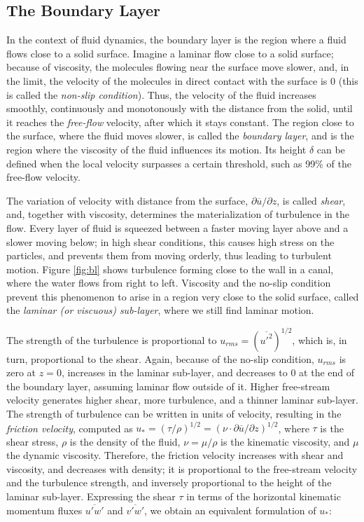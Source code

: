 \documentclass[a4paper]{book}
\begin{document}
\subsection{The Boundary Layer}
In the context of fluid dynamics, the boundary layer is the region where a fluid flows close to a solid surface. Imagine a laminar flow close to a solid surface; because of viscosity, the molecules flowing near the surface move slower, and, in the limit, the velocity of the molecules in direct contact with the surface is 0 (this is called the \emph{non-slip condition}). Thus, the velocity of the fluid increases smoothly, continuously and monotonously with the distance from the solid, until it reaches the \emph{free-flow} velocity, after which it stays constant. The region close to the surface, where the fluid moves slower, is called the \emph{boundary layer}, and is the region where the viscosity of the fluid influences its motion. Its height $\delta$ can be defined when the local velocity surpasses a certain threshold, such as 99\% of the free-flow velocity.

The variation of velocity with distance from the surface, $\partial\overline{u}/\partial z$, is called \emph{shear}, and, together with viscosity, determines the materialization of turbulence in the flow. Every layer of fluid is squeezed between a faster moving layer above and a slower moving below; in high shear conditions, this causes high stress on the particles, and prevents them from moving orderly, thus leading to turbulent motion. Figure \ref{fig:bl} shows turbulence forming close to the wall in a canal, where the water flows from right to left. Viscosity and the no-slip condition prevent this phenomenon to arise in a region very close to the solid surface, called the \emph{laminar (or viscuous) sub-layer}, where we still find laminar motion.

The strength of the turbulence is proportional to $u_{rms}=(\overline{u'^2})^{1/2}$, which is, in turn, proportional to the shear. Again, because of the no-slip condition, $u_{rms}$ is zero at $z=0$, increases in the laminar sub-layer, and decreases to 0 at the end of the boundary layer, assuming laminar flow outside of it. Higher free-stream velocity generates higher shear, more turbulence, and a thinner laminar sub-layer. The strength of turbulence can be written in units of velocity, resulting in the \emph{friction velocity}, computed as $u_*=(\tau/\rho)^{1/2}=(\nu\cdot\partial\overline{u}/\partial z)^{1/2}$, where $\tau$ is the shear stress, $\rho$ is the density of the fluid, $\nu=\mu/\rho$ is the kinematic viscosity, and $\mu$ the dynamic viscosity. Therefore, the friction velocity increases with shear and viscosity, and decreases with density; it is proportional to the free-stream velocity and the turbulence strength, and inversely proportional to the height of the laminar sub-layer. Expressing the shear $\tau$ in terms of the horizontal kinematic momentum fluxes $\overline{u'w'}$ and $\overline{v'w'}$, we obtain an equivalent formulation of $u_*$:
\end{document}
